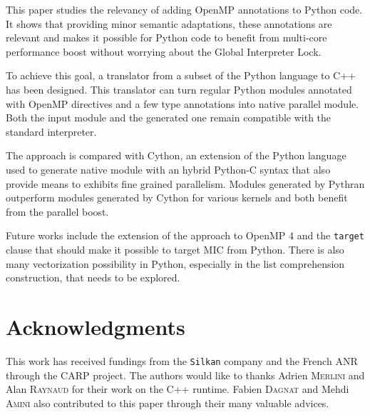 \documentclass{llncs}
\begin{document}
This paper studies the relevancy of adding OpenMP annotations to Python code. It
shows that providing minor semantic adaptations, these annotations are relevant
and makes it possible for Python code to benefit from multi-core performance
boost without worrying about the Global Interpreter Lock.

To achieve this goal, a translator from a subset of the Python language to C++
has been designed. This translator can turn regular Python modules
annotated with OpenMP directives and a few type annotations into native parallel
module. Both the input module and the generated one remain compatible with the
standard interpreter.

The approach is compared with Cython, an extension of the Python language used
to generate native module with an hybrid Python-C syntax that also provide means
to exhibits fine grained parallelism. Modules generated by Pythran outperform
modules generated by Cython for various kernels and both benefit from the
parallel boost.

Future works include the extension of the approach to OpenMP 4 and the
\texttt{target} clause that should make it possible to target MIC from Python.
There is also many vectorization possibility in Python, especially in the list
comprehension construction, that needs to be explored.

\section*{Acknowledgments}

This work has received fundings from the \texttt{Silkan} company and the French
ANR through the CARP project. The authors would like to thanks Adrien
\textsc{Merlini} and Alan \textsc{Raynaud} for their work on the C++ runtime.
Fabien \textsc{Dagnat} and Mehdi \textsc{Amini} also contributed to this paper
through their many valuable advices.



\end{document}
